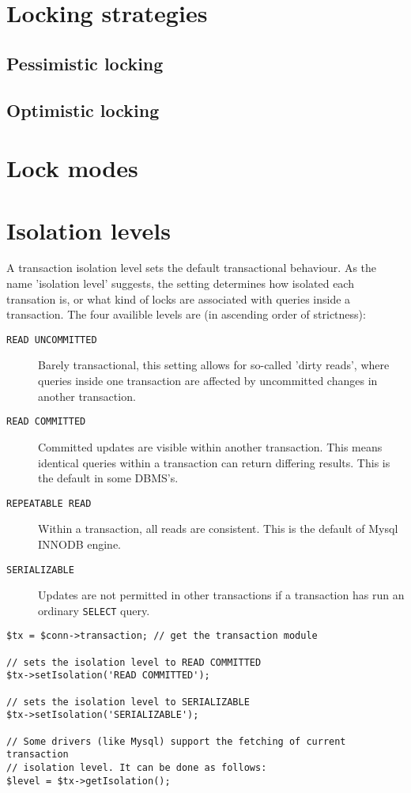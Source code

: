 \documentclass[11pt,a4paper]{report}
\begin{document}
\section{Locking strategies}
\subsection{Pessimistic locking}
\subsection{Optimistic locking}
\section{Lock modes}
\section{Isolation levels}
A transaction isolation level sets the default transactional behaviour. As the name 'isolation level' suggests, the setting determines how isolated each transation is, or what kind of locks are associated with queries inside a transaction. The four availible levels are (in ascending order of strictness):

\begin{description}
\item[\texttt{READ UNCOMMITTED}] {Barely transactional, this setting allows for so-called 'dirty reads', where queries inside one transaction are affected by uncommitted changes in another transaction.}
\item[\texttt{READ COMMITTED}] {Committed updates are visible within another transaction.  This means identical queries within a transaction can return differing results. This is the default in some DBMS's.}
\item[\texttt{REPEATABLE READ}] {Within a transaction, all reads are consistent. This is the default of Mysql INNODB engine.}
\item[\texttt{SERIALIZABLE}] {Updates are not permitted in other transactions if a transaction has run an ordinary \texttt{SELECT} query.}
\end{description}

\begin{verbatim}
$tx = $conn->transaction; // get the transaction module

// sets the isolation level to READ COMMITTED
$tx->setIsolation('READ COMMITTED');

// sets the isolation level to SERIALIZABLE
$tx->setIsolation('SERIALIZABLE');

// Some drivers (like Mysql) support the fetching of current transaction
// isolation level. It can be done as follows:
$level = $tx->getIsolation();
\end{verbatim}
\end{document}
